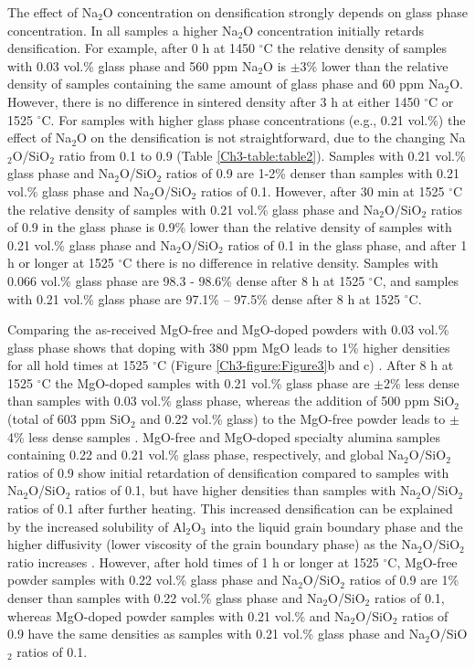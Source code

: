 The effect of Na$_{2}$O concentration on densification strongly depends on glass phase concentration. In all samples a higher Na$_{2}$O concentration initially retards densification. For example, after 0 h at 1450 $^{\circ}$C the relative density of samples with 0.03 vol.\% glass phase and 560 ppm Na$_{2}$O is $\pm$3\% lower than the relative density of samples containing the same amount of glass phase and 60 ppm Na$_{2}$O.  However, there is no difference in sintered density after 3 h at either 1450 $^{\circ}$C or 1525 $^{\circ}$C. For samples with higher glass phase concentrations (e.g., 0.21 vol.\%) the effect of Na$_{2}$O on the densification is not straightforward, due to the changing Na$_{2}$O/SiO$_{2}$ ratio from 0.1 to 0.9 (Table \ref{Ch3-table:table2}). Samples with 0.21 vol.\% glass phase and Na$_{2}$O/SiO$_{2}$ ratios of 0.9 are 1-2\% denser than samples with 0.21 vol.\% glass phase and Na$_{2}$O/SiO$_{2}$ ratios of 0.1. However, after 30 min at 1525 $^{\circ}$C the relative density of samples with 0.21 vol.\% glass phase and Na$_{2}$O/SiO$_{2}$ ratios of 0.9 in the glass phase is 0.9\% lower than the relative density of samples with 0.21 vol.\% glass phase and Na$_{2}$O/SiO$_{2}$ ratios of 0.1 in the glass phase, and after 1 h or longer at 1525 $^{\circ}$C there is no difference in relative density. Samples with 0.066 vol.\% glass phase are 98.3 - 98.6\% dense after 8 h at 1525 $^{\circ}$C, and samples with 0.21 vol.\% glass phase are 97.1\% – 97.5\% dense after 8 h at 1525 $^{\circ}$C. 

Comparing the as-received MgO-free and MgO-doped powders with 0.03 vol.\% glass phase shows that doping with 380 ppm MgO leads to 1\% higher densities for all hold times at 1525 $^{\circ}$C (Figure \ref{Ch3-figure:Figure3}b and c) \cite{Frueh2016}. After 8 h at 1525 $^{\circ}$C the MgO-doped samples with 0.21 vol.\% glass phase are $\pm$2\% less dense than samples with 0.03 vol.\% glass phase, whereas the addition of 500 ppm SiO$_{2}$ (total of 603 ppm SiO$_{2}$ and 0.22 vol.\% glass) to the MgO-free powder leads to $\pm$4\% less dense samples \cite{Frueh2016}. MgO-free and MgO-doped specialty alumina samples containing 0.22 and 0.21 vol.\% glass phase, respectively, and global Na$_{2}$O/SiO$_{2}$ ratios of 0.9 show initial retardation of densification compared to samples with Na$_{2}$O/SiO$_{2}$ ratios of 0.1, but have higher densities than samples with Na$_{2}$O/SiO$_{2}$ ratios of 0.1 after further heating. This increased densification can be explained by the increased solubility of Al$_{2}$O$_{3}$ into the liquid grain boundary phase and the higher diffusivity (lower viscosity of the grain boundary phase) as the Na$_{2}$O/SiO$_{2}$ ratio increases \cite{Frueh2016,Kwon1991}. However, after hold times of 1 h or longer at 1525 $^{\circ}$C, MgO-free powder samples with 0.22 vol.\% glass phase and Na$_{2}$O/SiO$_{2}$ ratios of 0.9 are 1\% denser than samples with 0.22 vol.\% glass phase and Na$_{2}$O/SiO$_{2}$ ratios of 0.1, whereas MgO-doped powder samples with 0.21 vol.\% and Na$_{2}$O/SiO$_{2}$ ratios of 0.9 have the same densities as samples with 0.21 vol.\% glass phase and Na$_{2}$O/SiO$_{2}$ ratios of 0.1. 

